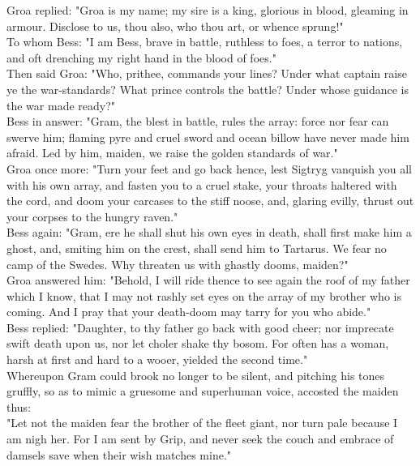 \documentclass[10pt,a4paper]{report}
\begin{document}
Groa replied: "Groa is my name; my sire is a king, glorious in blood, gleaming in armour. Disclose to us, thou also, who thou art, or whence sprung!"\\

To whom Bess: "I am Bess, brave in battle, ruthless to foes, a terror to nations, and oft drenching my right hand in the blood of foes."\\

Then said Groa: "Who, prithee, commands your lines? Under what captain raise ye the war-standards? What prince controls the battle? Under whose guidance is the war made ready?"\\

Bess in answer: "Gram, the blest in battle, rules the array: force nor fear can swerve him; flaming pyre and cruel sword and ocean billow have never made him afraid. Led by him, maiden, we raise the golden standards of war."\\

Groa once more: "Turn your feet and go back hence, lest Sigtryg vanquish you all with his own array, and fasten you to a cruel stake, your throats haltered with the cord, and doom your carcases to the stiff noose, and, glaring evilly, thrust out your corpses to the hungry raven."\\

Bess again: "Gram, ere he shall shut his own eyes in death, shall first make him a ghost, and, smiting him on the crest, shall send him to Tartarus. We fear no camp of the Swedes. Why threaten us with ghastly dooms, maiden?"\\

Groa answered him: "Behold, I will ride thence to see again the roof of my father which I know, that I may not rashly set eyes on the array of my brother who is coming. And I pray that your death-doom may tarry for you who abide."\\

Bess replied: "Daughter, to thy father go back with good cheer; nor imprecate swift death upon us, nor let choler shake thy bosom. For often has a woman, harsh at first and hard to a wooer, yielded the second time."\\

Whereupon Gram could brook no longer to be silent, and pitching his tones gruffly, so as to mimic a gruesome and superhuman voice, accosted the maiden thus:\\

"Let not the maiden fear the brother of the fleet giant, nor turn pale because I am nigh her. For I am sent by Grip, and never seek the couch and embrace of damsels save when their wish matches mine."\\
\end{document}
